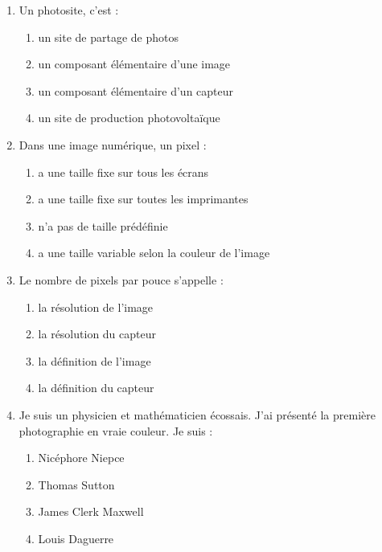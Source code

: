 \documentclass[a4paper]{article}
\begin{document}
\begin{enumerate}
  \item Un photosite, c'est :
    \begin{multicols}{4}
      \begin{enumerate}
	\item un site de partage de photos
	\item un composant élémentaire d'une image
	\item un composant élémentaire d'un capteur
	\item un site de production photovoltaïque
      \end{enumerate}
    \end{multicols}
  \item Dans une image numérique, un pixel :
    \begin{multicols}{4}
      \begin{enumerate}
	\item a une taille fixe sur tous les écrans
	\item a une taille fixe sur toutes les imprimantes
	\item n'a pas de taille prédéfinie
	\item a une taille variable selon la couleur de l'image
      \end{enumerate}
    \end{multicols}
  \item Le nombre de pixels par pouce s'appelle :
    \begin{multicols}{4}
      \begin{enumerate}
	\item la résolution de l'image
	\item la résolution du capteur
	\item la définition de l'image
	\item la définition du capteur
      \end{enumerate}
    \end{multicols}
  \item Je suis un physicien et mathématicien écossais. J'ai présenté la première photographie en vraie couleur. Je suis :
    \begin{multicols}{4}
      \begin{enumerate}
	\item Nicéphore Niepce
	\item Thomas Sutton
	\item James Clerk Maxwell
	\item Louis Daguerre
      \end{enumerate}
    \end{multicols}
\end{enumerate}
\end{document}
